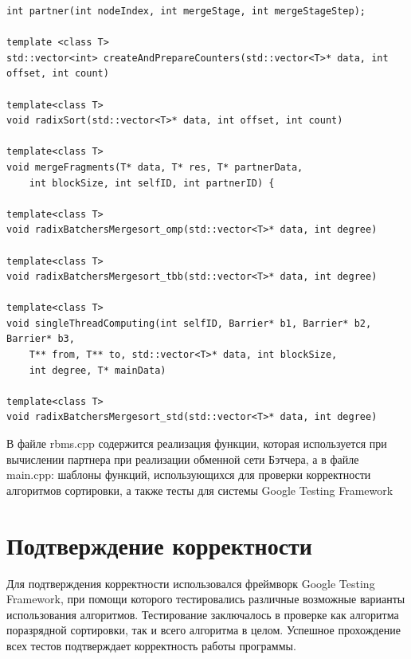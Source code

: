 \documentclass{report}
\begin{document}
\begin{lstlisting}
int partner(int nodeIndex, int mergeStage, int mergeStageStep);

template <class T>
std::vector<int> createAndPrepareCounters(std::vector<T>* data, int offset, int count)

template<class T>
void radixSort(std::vector<T>* data, int offset, int count)

template<class T>
void mergeFragments(T* data, T* res, T* partnerData,
    int blockSize, int selfID, int partnerID) {
    
template<class T>
void radixBatchersMergesort_omp(std::vector<T>* data, int degree)

template<class T>
void radixBatchersMergesort_tbb(std::vector<T>* data, int degree)

template<class T>
void singleThreadComputing(int selfID, Barrier* b1, Barrier* b2, Barrier* b3,
    T** from, T** to, std::vector<T>* data, int blockSize,
    int degree, T* mainData)
    
template<class T>
void radixBatchersMergesort_std(std::vector<T>* data, int degree)
\end{lstlisting}
\par В файле rbms.cpp содержится реализация функции, которая используется при вычислении партнера при реализации обменной сети Бэтчера, а в файле main.cpp: шаблоны функций, использующихся для проверки корректности алгоритмов сортировки, а также тесты для системы Google Testing Framework

\newpage

\section*{Подтверждение корректности}
Для подтверждения корректности использовался фреймворк Google Testing Framework, при помощи которого тестировались различные возможные варианты использования алгоритмов. Тестирование заключалось в проверке как алгоритма поразрядной сортировки, так и всего алгоритма в целом. Успешное прохождение всех тестов подтверждает корректность работы программы.
\newpage

\end{document}
